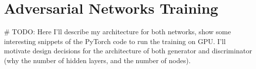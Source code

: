 
\chapter{Adversarial Networks Training} %
\# TODO: Here I'll describe my architecture for both networks, show some interesting snippets of the PyTorch code to run the training on GPU. I'll motivate design decisions for the architecture of both generator and discriminator (why the number of hidden layers, and the number of nodes).

\label{Chapter5} %




